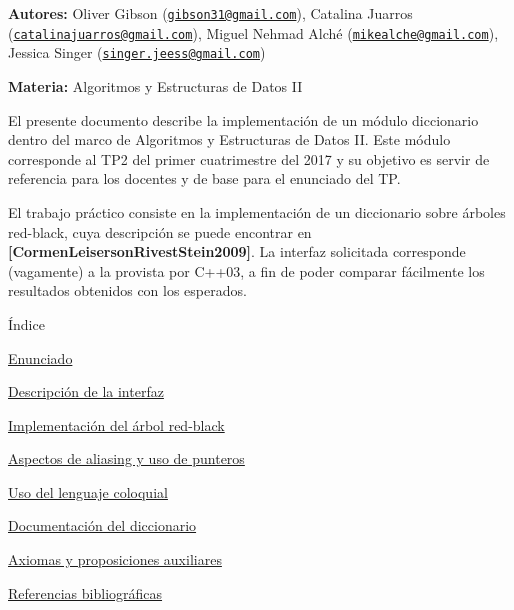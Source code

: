 
\begin{DoxyItemize}
\item {\bfseries Autores\+:} Oliver Gibson (\href{mailto:gibson31@gmail.com}{\tt gibson31@gmail.\+com}), Catalina Juarros (\href{mailto:catalinajuarros@gmail.com}{\tt catalinajuarros@gmail.\+com}), Miguel Nehmad Alché (\href{mailto:mikealche@gmail.com}{\tt mikealche@gmail.\+com}), Jessica Singer (\href{mailto:singer.jeess@gmail.com}{\tt singer.\+jeess@gmail.\+com})
\item {\bfseries Materia\+:} Algoritmos y Estructuras de Datos II
\end{DoxyItemize}

El presente documento describe la implementación de un módulo diccionario dentro del marco de Algoritmos y Estructuras de Datos II. Este módulo corresponde al T\+P2 del primer cuatrimestre del 2017 y su objetivo es servir de referencia para los docentes y de base para el enunciado del TP.

El trabajo práctico consiste en la implementación de un diccionario sobre árboles red-\/black, cuya descripción se puede encontrar en {\bfseries [Cormen\+Leiserson\+Rivest\+Stein2009]}. La interfaz solicitada corresponde (vagamente) a la provista por C++03, a fin de poder comparar fácilmente los resultados obtenidos con los esperados.

\begin{DoxyParagraph}{Índice}

\end{DoxyParagraph}

\begin{DoxyItemize}
\item \hyperlink{Enunciado}{Enunciado}
\item \hyperlink{Interfaz}{Descripción de la interfaz}
\item \hyperlink{Implementacion}{Implementación del árbol red-\/black}
\item \hyperlink{Aliasing}{Aspectos de aliasing y uso de punteros}
\item \hyperlink{Castellano}{Uso del lenguaje coloquial}
\item \hyperlink{classaed2_1_1map}{Documentación del diccionario }
\item \hyperlink{axiomas}{Axiomas y proposiciones auxiliares}
\item \hyperlink{citelist}{Referencias bibliográficas} 
\end{DoxyItemize}